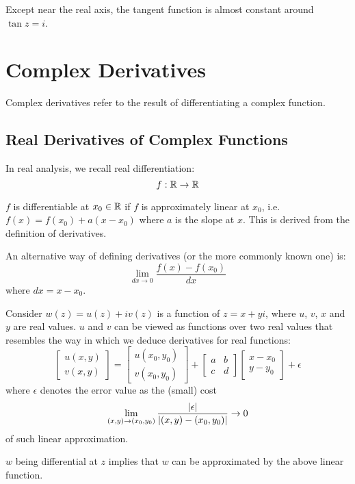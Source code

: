 \documentclass[12pt]{article}
\begin{document}
	Except near the real axis, the tangent function is almost constant around $\tan z = i$.
	
	\section{Complex Derivatives}
	
	Complex derivatives refer to the result of differentiating a complex function.
	
	\subsection{Real Derivatives of Complex Functions}
	
	In real analysis, we recall real differentiation: $$f: \mathbb{R} \to \mathbb{R}$$
	
	$f$ is differentiable at $x_0 \in \mathbb{R}$ if $f$ is approximately linear at $x_0$, i.e. $f(x) = f(x_0) + a(x - x_0)$ where $a$ is the slope at $x$. This is derived from the definition of derivatives.
	
	An alternative way of defining derivatives (or the more commonly known one) is: $$\lim_{dx \to 0} \frac{f(x) - f(x_0)}{dx}$$ where $dx = x - x_0$.
	
	Consider $w(z) = u(z) + iv(z)$ is a function of $z = x + yi$, where $u$, $v$, $x$ and $y$ are real values. $u$ and $v$ can be viewed as functions over two real values that resembles the way in which we deduce derivatives for real functions:
	\begin{equation*}
		\begin{bmatrix}
			u(x, y) \\ v(x, y)
		\end{bmatrix} = 
		\begin{bmatrix}
			u(x_0, y_0) \\ v(x_0, y_0)
		\end{bmatrix} +
		\begin{bmatrix}
			a & b \\c & d
		\end{bmatrix}
		\begin{bmatrix}
			x - x_0 \\ y - y_0
		\end{bmatrix}  + \epsilon
	\end{equation*}
	where $\epsilon$ denotes the error value as the (small)  cost $$\lim_{(x, y)  \to (x_0, y_0)}\frac{\lvert \epsilon \rvert}{\lvert (x, y) - (x_0, y_0) \rvert} \to 0$$
	of such linear approximation.
	
	$w$ being differential at $z$ implies that $w$ can be approximated by the above linear function.
	
\end{document}
